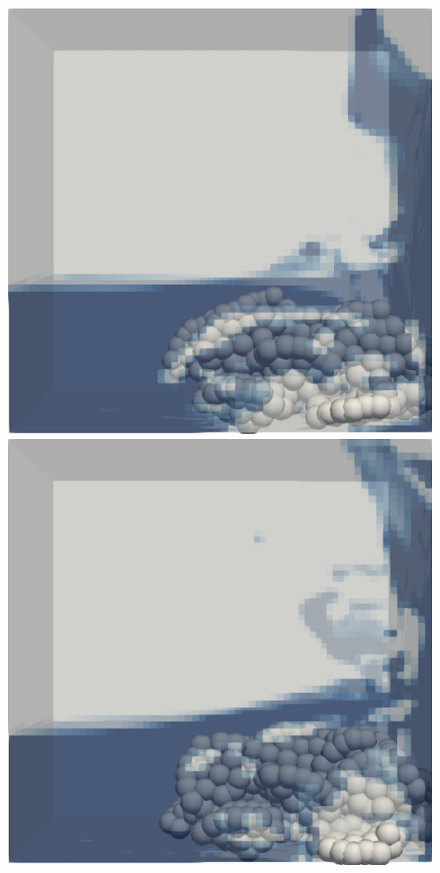 \begin{figure}[H]
\begin{minipage}{.4\textwidth}
    \end{minipage}
    \newline
    \begin{minipage}{.4\textwidth}
        \centering
        \includegraphics[width=\linewidth]{GWU_Thesis_Sarmakeeva/Images/chap4/landslide_3.png}
    \end{minipage}%
    \hspace{0.05\textwidth}
    \begin{minipage}{.4\textwidth}
        \centering
        \includegraphics[width=\linewidth]{GWU_Thesis_Sarmakeeva/Images/chap4/landslide_4.png}

\end{minipage}
\end{figure}
